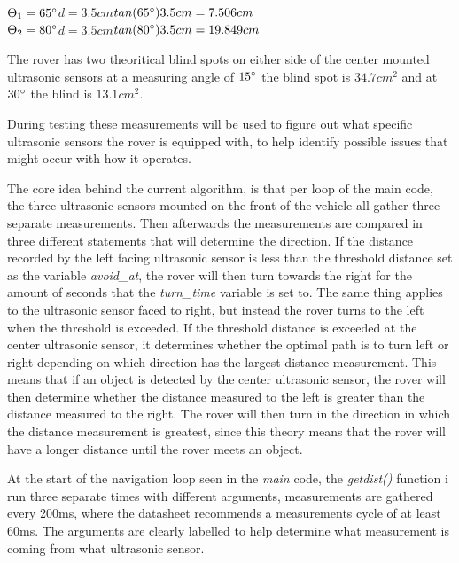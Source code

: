 $\Theta_1 = 65\degree$\quad\quad$d = 3.5cm$\quad\quad$tan(65\degree)3.5cm =  7.506cm$\\
$\Theta_2 = 80\degree$\quad\quad$d = 3.5cm$\quad\quad$tan(80\degree)3.5cm =  19.849cm$

The rover has two theoritical blind spots on either side of the center mounted ultrasonic sensors at a measuring angle of $15\degree$ the blind spot is $34.7cm^2$ and at $30\degree$ the blind is $13.1cm^2$. 

During testing these measurements will be used to figure out what specific ultrasonic sensors the rover is equipped with, to help identify possible issues that might occur with how it operates.

\clearpage


The core idea behind the current algorithm, is that per loop of the main code, the three ultrasonic sensors mounted on the front of the vehicle all gather three separate measurements. Then afterwards the measurements are compared in three different statements that will determine the direction. If the distance recorded by the left facing ultrasonic sensor is less than the threshold distance set as the variable \textit{avoid\_at}, the rover will then turn towards the right for the amount of seconds that the \textit{turn\_time} variable is set to. The same thing applies to the ultrasonic sensor faced to right, but instead the rover turns to the left when the threshold is exceeded.
If the threshold distance is exceeded at the center ultrasonic sensor, it determines whether the optimal path is to turn left or right depending on which direction has the largest distance measurement. This means that if an object is detected by the center ultrasonic sensor, the rover will then determine whether the distance measured to the left is greater than the distance measured to the right. The rover will then turn in the direction in which the distance measurement is greatest, since this theory means that the rover will have a longer distance until the rover meets an object.

\clearpage


At the start of the navigation loop seen in the \textit{main} code, the \textit{getdist()} function i run three separate times with different arguments, measurements are gathered every 200ms, where the datasheet recommends a measurements cycle of at least 60ms. The arguments are clearly labelled to help determine what measurement is coming from what ultrasonic sensor.
